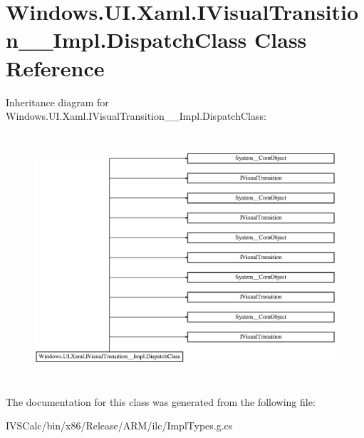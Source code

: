\hypertarget{class_windows_1_1_u_i_1_1_xaml_1_1_i_visual_transition_____impl_1_1_dispatch_class}{}\section{Windows.\+U\+I.\+Xaml.\+I\+Visual\+Transition\+\_\+\+\_\+\+Impl.\+Dispatch\+Class Class Reference}
\label{class_windows_1_1_u_i_1_1_xaml_1_1_i_visual_transition_____impl_1_1_dispatch_class}
Inheritance diagram for Windows.\+U\+I.\+Xaml.\+I\+Visual\+Transition\+\_\+\+\_\+\+Impl.\+Dispatch\+Class\+:\begin{figure}[H]
\begin{center}
\leavevmode
\includegraphics[height=9.221557cm]{class_windows_1_1_u_i_1_1_xaml_1_1_i_visual_transition_____impl_1_1_dispatch_class}
\end{center}
\end{figure}


The documentation for this class was generated from the following file\+:\begin{DoxyCompactItemize}
\item 
I\+V\+S\+Calc/bin/x86/\+Release/\+A\+R\+M/ilc/Impl\+Types.\+g.\+cs\end{DoxyCompactItemize}
